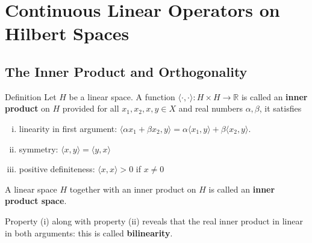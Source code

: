 \chapter{Continuous Linear Operators on Hilbert Spaces}

\section{The Inner Product and Orthogonality}

\begin{namedthm*}{Definition}
    Let $H$ be a linear space.
    A function $\langle\cdot,\cdot\rangle:H\times H\to\mathbb{R}$ is called an \textbf{inner product} on $H$ provided for all $x_1,x_2,x,y\in X$ and real numbers $\alpha,\beta$, it satisfies
    \begin{enumerate}[(i)]
        \item linearity in first argument: $\langle \alpha x_1+\beta x_2,y\rangle=\alpha\langle x_1,y\rangle+\beta\langle x_2,y\rangle$.
        \item symmetry: $\langle x,y\rangle=\langle y,x\rangle$
        \item positive definiteness: $\langle x,x\rangle>0$ if $x\neq0$
    \end{enumerate}
    A linear space $H$ together with an inner product on $H$ is called an \textbf{inner product space}.
\end{namedthm*}
Property (i) along with property (ii) reveals that the real inner product in linear in both arguments: this is called \textbf{bilinearity}.

